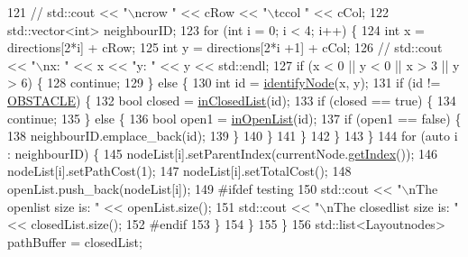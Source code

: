 \begin{DoxyCode}
121         \textcolor{comment}{// std::cout << "\(\backslash\)ncrow " << cRow << "\(\backslash\)tccol " << cCol;}
122         std::vector<int> neighbourID;
123         \textcolor{keywordflow}{for} (\textcolor{keywordtype}{int} i = 0; i < 4; i++) \{
124             \textcolor{keywordtype}{int} x = directions[2*i] + cRow;
125             \textcolor{keywordtype}{int} y = directions[2*i +1] + cCol;
126             \textcolor{comment}{// std::cout << "\(\backslash\)nx: " << x << "y: " << y << std::endl;}
127             \textcolor{keywordflow}{if} (x < 0 || y < 0 || x > 3 || y > 6) \{
128             \textcolor{keywordflow}{continue};
129             \} \textcolor{keywordflow}{else} \{
130                 \textcolor{keywordtype}{int} \textcolor{keywordtype}{id} = \hyperlink{classAstar_a109c83eda957a93365b25175bf53a35d}{identifyNode}(x, y);
131                 \textcolor{keywordflow}{if} (\textcolor{keywordtype}{id} != \hyperlink{Astar_8cpp_af2ea9daadfc38f4b5b104224552aabcb}{OBSTACLE}) \{
132                     \textcolor{keywordtype}{bool} closed = \hyperlink{classAstar_a5166499b45a2a89401deb2bd5b73abfe}{inClosedList}(\textcolor{keywordtype}{id});
133                     \textcolor{keywordflow}{if} (closed == \textcolor{keyword}{true}) \{
134                         \textcolor{keywordflow}{continue};
135                     \} \textcolor{keywordflow}{else} \{
136                         \textcolor{keywordtype}{bool} open1 = \hyperlink{classAstar_a1adfbc35ff083175e4e3e28ec4f6771d}{inOpenList}(\textcolor{keywordtype}{id});
137                         \textcolor{keywordflow}{if} (open1 == \textcolor{keyword}{false}) \{
138                             neighbourID.emplace\_back(\textcolor{keywordtype}{id});
139                         \}
140                     \}
141                 \}
142             \}
143         \}
144         \textcolor{keywordflow}{for} (\textcolor{keyword}{auto} i : neighbourID) \{
145             nodeList[i].setParentIndex(currentNode.\hyperlink{classLayoutnodes_ae9d58b708008c5ba3ca9cfa8d5340c25}{getIndex}());
146             nodeList[i].setPathCost(1);
147             nodeList[i].setTotalCost();
148             openList.push\_back(nodeList[i]);
149 \textcolor{preprocessor}{            #ifdef testing}
150             std::cout << \textcolor{stringliteral}{"\(\backslash\)nThe openlist size is: "} << openList.size();
151             std::cout << \textcolor{stringliteral}{"\(\backslash\)nThe closedlist size is: "} << closedList.size();
152 \textcolor{preprocessor}{            #endif}
153         \}
154         \}
155     \}
156     std::list<Layoutnodes> pathBuffer = closedList;

\end{DoxyCode}
